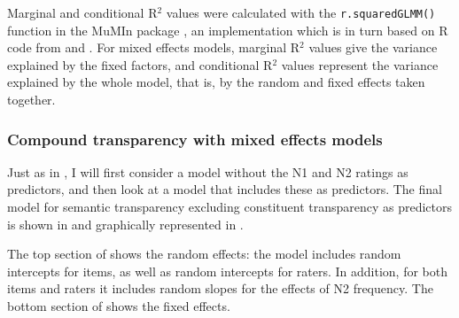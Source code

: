 \enlargethispage{1\baselineskip}
Marginal and conditional R$^2$ values were calculated with the
\texttt{r.squaredGLMM()} function in the MuMIn package \citep{MuMIn}, an
implementation which is in turn based on \textsf{R} code from
\citet{NakagawaandSchielzeth:2013} and \citet{Johnson:2014}. For mixed
effects models, marginal R$^2$ values give the variance explained by the
fixed factors, and conditional R$^2$ values represent the variance
explained by the whole model, that is, by the random and fixed effects
taken together.



\subsubsection{Compound transparency with mixed effects models}
\label{sec:bs2013_mixed-effects}


Just as in \citet{BellandSchaefer:2013}, I will first consider a model
without the N1 and N2 ratings as predictors, and then look at a model
that includes these as predictors. The final model for semantic
transparency excluding constituent transparency as predictors is shown in
  and graphically represented in .

The top section of  shows the random effects:
the model includes random intercepts for items, as well as random
intercepts for raters. In addition, for both items and raters it
includes random slopes for the effects of N2 frequency. The bottom section of  shows the fixed effects.
 

